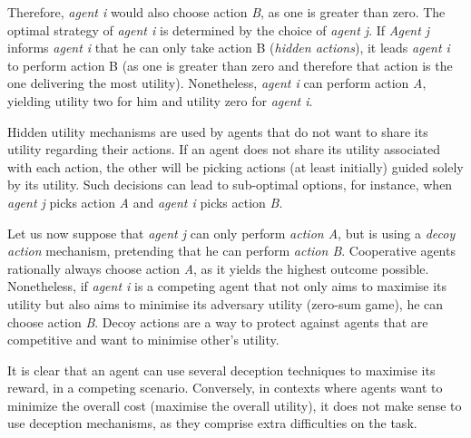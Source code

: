 Therefore, \textit{agent i} would also choose action \textit{B}, as one is greater than zero. The optimal strategy of \textit{agent i} is determined by the choice of \textit{agent j}. If \textit{Agent j} informs \textit{agent i} that he can only take action B (\textit{hidden actions}), it leads \textit{agent i} to perform action B (as one is greater than zero and therefore that action is the one delivering the most utility). Nonetheless, \textit{agent i} can perform action \textit {A}, yielding utility two for him and utility zero for \textit{agent i}. 

Hidden utility mechanisms are used by agents that do not want to share its utility regarding their actions. If an agent does not share its utility associated with each action, the other will be picking actions (at least initially) guided solely by its utility. Such decisions can lead to sub-optimal options, for instance, when \textit{agent j} picks action \textit{A} and \textit{agent i} picks action \textit{B}. 
 
Let us now suppose that \textit{agent j} can only perform \textit{action A}, but is using a \textit{decoy action} mechanism, pretending that he can perform \textit{action B}. Cooperative agents rationally always choose action \textit{A}, as it yields the highest outcome possible. Nonetheless, if \textit{agent i} is a competing agent that not only aims to maximise its utility but also aims to minimise its adversary utility (zero-sum game), he can choose action \textit{B}. Decoy actions are a way to protect against agents that are competitive and want to minimise other's utility.

It is clear that an agent can use several deception techniques to maximise its reward, in a competing scenario. Conversely, in contexts where agents want to minimize the overall cost (maximise the overall utility), it does not make sense to use deception mechanisms, as they comprise extra difficulties on the task.

